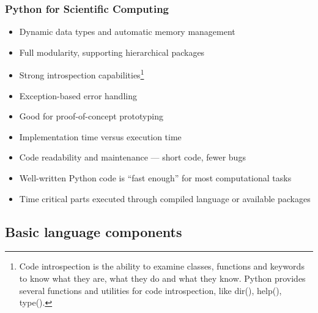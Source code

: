 \begin{frame}
  \MyLogo
  \frametitle{Python for Scientific Computing}  

\small
\smallskip
{}
\begin{itemize}
	\item Dynamic data types and automatic memory management
	\item Full modularity, supporting hierarchical packages
	\item Strong introspection capabilities\footnote[frame]{\scriptsize\color{PineGreen}Code introspection is the ability to examine classes, functions and keywords to know what they are, what they do and what they know. Python provides several functions and utilities for code introspection, like dir(), help(), type().}
	\item Exception-based error handling
\end{itemize}

\begin{itemize}
	\item Good for proof-of-concept prototyping
	\item Implementation time versus execution time
	\item Code readability and maintenance --- short code, fewer bugs
	\item Well-written Python code is ``fast enough'' for most computational tasks
	\item Time critical parts executed through compiled language or \alert{available packages}
\end{itemize}

\end{frame}

\subsection{Basic language components}

